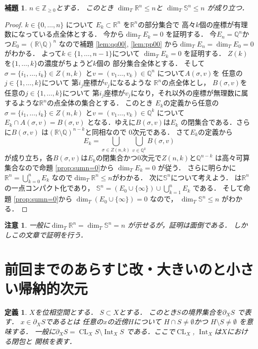 \documentclass[leqno, a4paper, 12pt]{jsarticle}
\newtheorem{lem}[thm]{補題}
\newtheorem{df}[thm]{定義}
\newtheorem*{rmk}{注意}
\newcommand{\zz}{\mathbb{Z}}
\newcommand{\qq}{\mathbb{Q}}
\newcommand{\rr}{\mathbb{R}}
\DeclareMathOperator{\cl}{CL}
\DeclareMathOperator{\nai}{Int}
\numberwithin{equation}{section}
\begin{document}
\begin{lem}\label{lem:nnn}
$n\in \zz_{\ge 0}$とする．
このとき
$\dim_{T}\rr^{n}\le n$と
$\dim_{T}\mathbb{S}^{n}\le n$
が成り立つ．
\end{lem}
\begin{proof}
$k\in \{0, \dots, n\}$
について
$E_{k}\subset \rr^{n}$
を$\rr^{n}$の部分集合で
高々$k$個の座標が有理数になっている点全体とする．
今から$\dim_{T}E_{k}= 0$
を証明する．
今$E_{n}=\qq^{n}$かつ$E_{0}=(\rr\setminus \qq)^{n}$
なので補題 \ref{lem:qq00}, \ref{lem:pp00}
から$\dim_{T}E_{n}=\dim_{T}E_{0}=0$
がわかる．
よって$k\in \{1, \dots, n-1\}$について
$\dim_{T}E_{k}= 0$
を証明する．
$Z(k)$を$\{1, \dots, k\}$の濃度がちょうど$k$個の
部分集合全体とする．
そして$\sigma=\{i_{1}, \dots, i_{k}\}\in Z(n, k)$
と$v=(v_{1}\dots, v_{k})\in \qq^{n}$
について$A(\sigma, v)$を
任意の$j\in \{1, \dots, k\}$について
第$i_{j}$座標が$v_{j}$になるような
$\rr^{n}$の点全体とし，
$B(\sigma, v)$を
任意の$j\in \{1, \dots, k\}$について
第$i_{j}$座標が$v_{j}$になり，それ以外の座標が無理数に属するような$\rr^{n}$の点全体の集合とする．
このとき
$E_{k}$の定義から任意の$\sigma=\{i_{1}, \dots, i_{k}\}\in Z(n, k)$
と$v=(v_{1}\dots, v_{k})\in \qq^{k}$
について$E_{k}\cap A(\sigma, v)=B(\sigma, v)$
となる．ゆえに$B(\sigma, v)$は$E_{k}$
の閉集合である．さらに$B(\sigma, v)$
は$(\rr\setminus \qq)^{n-k}$と同相なので
$0$次元である．
さて$E_{k}$の定義から
\[
E_{k}=\bigcup_{\sigma\in Z(n, k)}\bigcup_{v\in \qq^{k}}
B(\sigma, v)
\]
が成り立ち，各$B(\sigma, v)$は$E_{k}$の閉集合かつ$0$次元で$Z(n, k)$と$\qq^{n-k}$
は高々可算集合なので命題 \ref{prop:sumn=0}から
$\dim_{T}E_{k}=0$
が従う．
さらに明らかに$\rr^{n}=\bigcup_{k=0}^{n}E_{k}$
なので$\dim_{T}\rr^{n}\le n$がわかる．
次に$\mathbb{S}^{n}$について考えよう．
は$\rr^{n}$の一点コンパクト化であり，
$\mathbb{S}^{n}=(E_{0}\cup\{\infty\})\cup \bigcup_{k=1}^{n}E_{k}$
である．
そして命題 \ref{prop:sumn=0}から
$\dim_{T}(E_{0}\cup\{\infty\})= 0$
なので，
$\dim_{T}\mathbb{S}^{n}\le n$
がわかる．
\end{proof}
\begin{rmk}
一般に$\dim_{T}\rr^{n}=\dim_{T}\mathbb{S}^{n}=n$
が示せるが，証明は面倒である．
しかしこの文章で証明を行う．
\end{rmk}

\section{前回までのあらすじ改・大きいのと小さい帰納的次元}

\begin{df}
$X$を位相空間とする．
$S\subset X$とする．
このとき$S$の境界集合を$\partial_{X}S$
で表す．
$x\in \partial_{X}S$であるとは
任意の$x$の近傍$H$について
$H\cap S\neq \emptyset$かつ
$H\setminus S\neq \emptyset$
を意味する．
一般に$\partial_{X}S=\cl_{X}S\setminus \nai_{X}S$
である．ここで$\cl_{X}$, $\nai_{X}$は$X$における閉包と
開核を表す．
\end{df}
\end{document}
